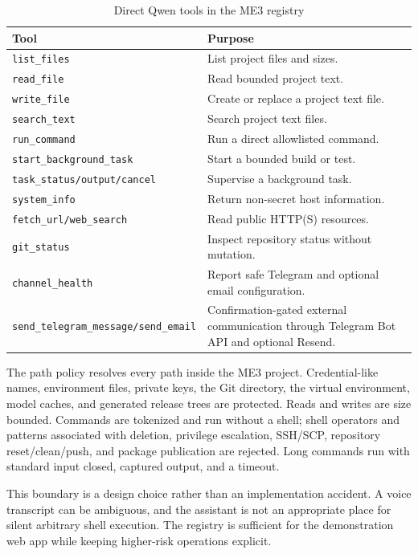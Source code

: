 \documentclass[sigconf,nonacm,balance=false]{acmart}
\begin{document}
\begin{table}[t]
\caption{Direct Qwen tools in the ME3 registry}
\label{tab:tools}
\small
\begin{tabularx}{\columnwidth}{@{}lX@{}}
\toprule
Tool & Purpose \\
\midrule
\texttt{list\_files} & List project files and sizes. \\
\texttt{read\_file} & Read bounded project text. \\
\texttt{write\_file} & Create or replace a project text file. \\
\texttt{search\_text} & Search project text files. \\
\texttt{run\_command} & Run a direct allowlisted command. \\
\texttt{start\_background\_task} & Start a bounded build or test. \\
\texttt{task\_status/output/cancel} & Supervise a background task. \\
\texttt{system\_info} & Return non-secret host information. \\
\texttt{fetch\_url/web\_search} & Read public HTTP(S) resources. \\
\texttt{git\_status} & Inspect repository status without mutation. \\
\texttt{channel\_health} & Report safe Telegram and optional email configuration. \\
\texttt{send\_telegram\_message/send\_email} & Confirmation-gated external
communication through Telegram Bot API and optional Resend. \\
\bottomrule
\end{tabularx}
\end{table}

The path policy resolves every path inside the ME3 project. Credential-like
names, environment files, private keys, the Git directory, the virtual
environment, model caches, and generated release trees are protected. Reads
and writes are size bounded. Commands are tokenized and run without a shell;
shell operators and patterns associated with deletion, privilege escalation,
SSH/SCP, repository reset/clean/push, and package publication are rejected.
Long commands run with standard input closed, captured output, and a timeout.

This boundary is a design choice rather than an implementation accident. A
voice transcript can be ambiguous, and the assistant is not an appropriate
place for silent arbitrary shell execution. The registry is sufficient for the
demonstration web app while keeping higher-risk operations explicit.
\end{document}
